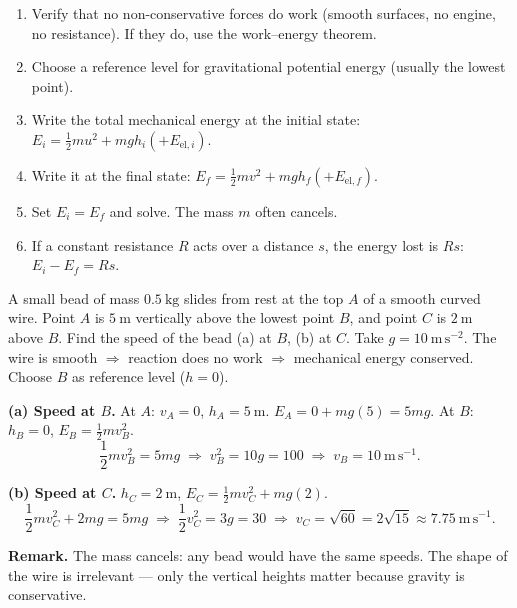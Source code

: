 \documentclass[11pt]{article}
\begin{document}
\begin{methode}
\begin{enumerate}
\item Verify that no non-conservative forces do work (smooth surfaces, no engine, no resistance). If they do, use the work–energy theorem.
\item Choose a reference level for gravitational potential energy (usually the lowest point).
\item Write the total mechanical energy at the initial state: $E_i = \frac{1}{2}mu^2 + mgh_i (+ E_{\text{el},i})$.
\item Write it at the final state: $E_f = \frac{1}{2}mv^2 + mgh_f (+ E_{\text{el},f})$.
\item Set $E_i = E_f$ and solve. The mass $m$ often cancels.
\item If a constant resistance $R$ acts over a distance $s$, the energy lost is $Rs$: $E_i - E_f = Rs$.
\end{enumerate}
\end{methode}

\begin{exoresolu}
A small bead of mass $0.5\ \mathrm{kg}$ slides from rest at the top $A$ of a smooth curved wire. Point $A$ is $5\ \mathrm{m}$ vertically above the lowest point $B$, and point $C$ is $2\ \mathrm{m}$ above $B$. Find the speed of the bead (a) at $B$, (b) at $C$. Take $g = 10\ \mathrm{m\,s^{-2}}$.
\tcblower
The wire is smooth $\Rightarrow$ reaction does no work $\Rightarrow$ mechanical energy conserved. Choose $B$ as reference level ($h=0$).

\textbf{(a) Speed at $B$.} At $A$: $v_A = 0$, $h_A = 5\ \mathrm{m}$. $E_A = 0 + mg(5) = 5mg$.
At $B$: $h_B = 0$, $E_B = \frac{1}{2}mv_B^2$.
\[
\frac{1}{2}mv_B^2 = 5mg \;\Longrightarrow\; v_B^2 = 10g = 100 \;\Longrightarrow\; v_B = 10\ \mathrm{m\,s^{-1}}.
\]

\textbf{(b) Speed at $C$.} $h_C = 2\ \mathrm{m}$, $E_C = \frac{1}{2}mv_C^2 + mg(2)$.
\[
\frac{1}{2}mv_C^2 + 2mg = 5mg \;\Longrightarrow\; \frac{1}{2}v_C^2 = 3g = 30 \;\Longrightarrow\; v_C = \sqrt{60} = 2\sqrt{15} \approx 7.75\ \mathrm{m\,s^{-1}}.
\]

\textbf{Remark.} The mass cancels: any bead would have the same speeds. The shape of the wire is irrelevant — only the vertical heights matter because gravity is conservative.
\end{exoresolu}
\end{document}
